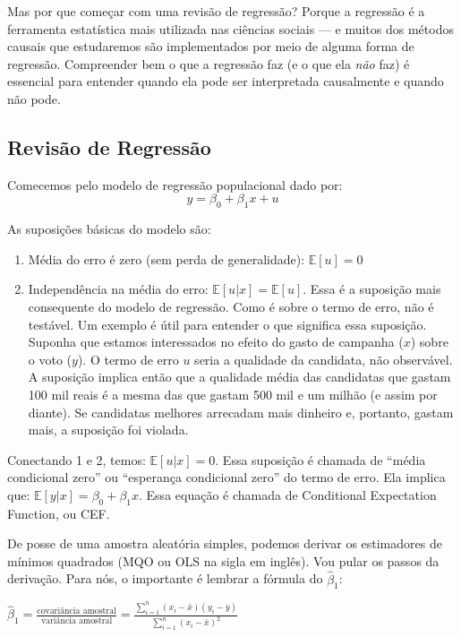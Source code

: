 \documentclass[
]{article}
\begin{document}
Mas por que começar com uma revisão de regressão? Porque a regressão é a ferramenta estatística mais utilizada nas ciências sociais --- e muitos dos métodos causais que estudaremos são implementados por meio de alguma forma de regressão. Compreender bem o que a regressão faz (e o que ela \emph{não} faz) é essencial para entender quando ela pode ser interpretada causalmente e quando não pode.

\subsection{Revisão de Regressão}\label{revisuxe3o-de-regressuxe3o}

Comecemos pelo modelo de regressão populacional dado por:
\[y = \beta_0 + \beta_1 x + u\]

As suposições básicas do modelo são:

\begin{enumerate}
\def\labelenumi{\arabic{enumi}.}
\item
  Média do erro é zero (sem perda de generalidade): \(\mathbb{E}[u] = 0\)
\item
  Independência na média do erro: \(\mathbb{E}[u|x] = \mathbb{E}[u]\). Essa é a suposição mais consequente do modelo de regressão. Como é sobre o termo de erro, não é testável. Um exemplo é útil para entender o que significa essa suposição. Suponha que estamos interessados no efeito do gasto de campanha (\(x\)) sobre o voto (\(y\)). O termo de erro \(u\) seria a qualidade da candidata, não observável. A suposição implica então que a qualidade média das candidatas que gastam 100 mil reais é a mesma das que gastam 500 mil e um milhão (e assim por diante). Se candidatas melhores arrecadam mais dinheiro e, portanto, gastam mais, a suposição foi violada.
\end{enumerate}

Conectando 1 e 2, temos: \(\mathbb{E}[u|x] = 0\). Essa suposição é chamada de ``média condicional zero'' ou ``esperança condicional zero'' do termo de erro. Ela implica que:
\(\mathbb{E}[y|x] = \beta_0 + \beta_1 x\). Essa equação é chamada de Conditional Expectation Function, ou CEF.

De posse de uma amostra aleatória simples, podemos derivar os estimadores de mínimos quadrados (MQO ou OLS na sigla em inglês). Vou pular os passos da derivação. Para nós, o importante é lembrar a fórmula do \(\hat{\beta}_1\):

\(\hat{\beta}_1 = \frac{\text{covariância amostral}}{\text{variância amostral}} = \frac{\sum_{i=1}^n(x_i - \bar{x})(y_i - \bar{y})}{\sum_{i=1}^n(x_i - \bar{x})^2}\)
\end{document}
